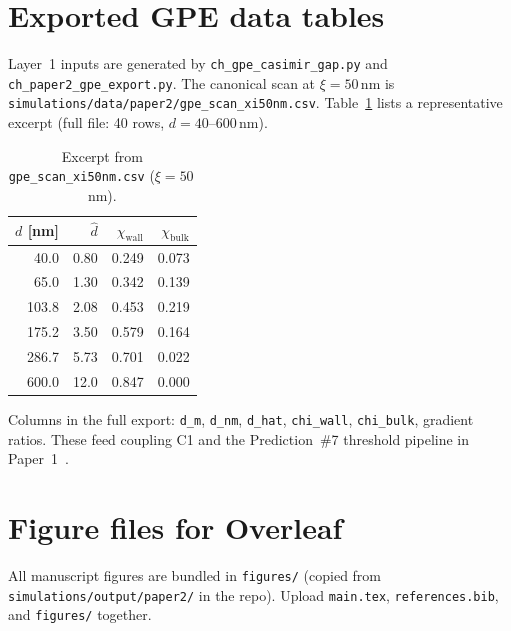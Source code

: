 \documentclass[11pt,a4paper]{article}
\begin{document}
\section{Exported GPE data tables}
\label{app:data}

Layer~1 inputs are generated by \texttt{ch\_gpe\_casimir\_gap.py} and \texttt{ch\_paper2\_gpe\_export.py}.
The canonical scan at $\xi=50$\,nm is \texttt{simulations/data/paper2/gpe\_scan\_xi50nm.csv}.
Table~\ref{tab:gpe-sample} lists a representative excerpt (full file: 40 rows, $d=40$--$600$\,nm).

\begin{table}[ht]
  \centering
  \small
  \caption{Excerpt from \texttt{gpe\_scan\_xi50nm.csv} ($\xi=50$\,nm).}
  \label{tab:gpe-sample}
  \begin{tabular}{@{}rrrr@{}}
    \toprule
    $d$ [nm] & $\hat d$ & $\chi_{\mathrm{wall}}$ & $\chi_{\mathrm{bulk}}$ \\
    \midrule
    40.0  & 0.80 & 0.249 & 0.073 \\
    65.0  & 1.30 & 0.342 & 0.139 \\
    103.8 & 2.08 & 0.453 & 0.219 \\
    175.2 & 3.50 & 0.579 & 0.164 \\
    286.7 & 5.73 & 0.701 & 0.022 \\
    600.0 & 12.0 & 0.847 & 0.000 \\
    \bottomrule
  \end{tabular}
\end{table}

Columns in the full export: \texttt{d\_m}, \texttt{d\_nm}, \texttt{d\_hat}, \texttt{chi\_wall}, \texttt{chi\_bulk}, gradient ratios.
These feed coupling C1 and the Prediction~\#7 threshold pipeline in Paper~1~\cite{CHPaper1}.

\section{Figure files for Overleaf}
\label{app:figures}

All manuscript figures are bundled in \texttt{figures/}
(copied from \texttt{simulations/output/paper2/} in the repo).
Upload \texttt{main.tex}, \texttt{references.bib}, and \texttt{figures/} together.
\end{document}
